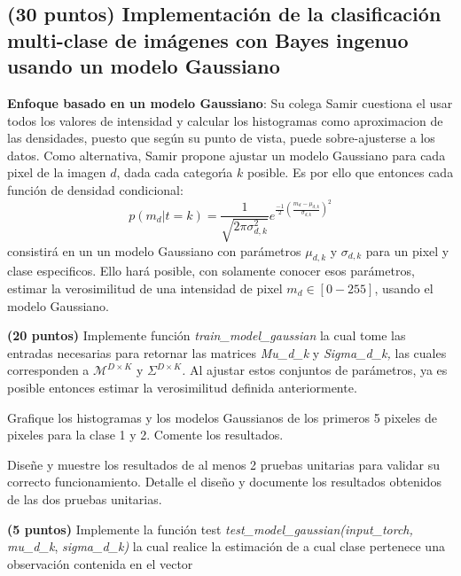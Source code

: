 \documentclass[spanish]{article}
\begin{document}
\begin{myEnumerate}
\section{(30 puntos) Implementaci\'{o}n de la clasificaci\'{o}n multi-clase
de im\'{a}genes con Bayes ingenuo usando un modelo Gaussiano}
\begin{myEnumerate}
\item \textbf{Enfoque basado en un modelo Gaussiano}: Su colega Samir cuestiona
el usar todos los valores de intensidad y calcular los histogramas
como aproximacion de las densidades, puesto que seg\'{u}n su punto
de vista, puede sobre-ajusterse a los datos. Como alternativa, Samir
propone ajustar un modelo Gaussiano para cada pixel de la imagen $d$,
dada cada categor\'{\i}a $k$ posible. Es por ello que entonces cada
funci\'{o}n de densidad condicional: 
\[
p\left(m_{d}|t=k\right)=\frac{1}{\sqrt{2\pi\sigma_{d,k}^{2}}}e^{\frac{-1}{2}\left(\frac{m_{d}-\mu_{d,k}}{\sigma_{d,k}}\right)^{2}}
\]
consistir\'{a} en un un modelo Gaussiano con par\'{a}metros $\mu_{d,k}$
y $\sigma_{d,k}$ para un pixel y clase especificos. Ello har\'{a}
posible, con solamente conocer esos par\'{a}metros, estimar la verosimilitud
de una intensidad de pixel $m_{d}\in\left[0-255\right]$, usando el
modelo Gaussiano.
\begin{myEnumerate}
\item \textbf{(20 puntos)} Implemente funci\'{o}n \emph{train\_model\_gaussian
}la cual tome las entradas necesarias para retornar las\emph{ }matrices\emph{
Mu\_d\_k }y \emph{Sigma\_d\_k, }las cuales corresponden a \emph{$\mathcal{M}^{D\times K}$
}y\emph{ $\Sigma^{D\times K}$. }Al ajustar estos conjuntos de par\'{a}metros,
ya es posible entonces estimar la verosimilitud definida anteriormente.
\begin{myEnumerate}
\item Grafique los histogramas y los modelos Gaussianos de los primeros
5 pixeles  de pixeles para la clase 1 y 2. Comente los resultados.
\item Dise\~{n}e y muestre los resultados de al menos 2 pruebas unitarias
para validar su correcto funcionamiento. Detalle el dise\~{n}o y documente
los resultados obtenidos de las dos pruebas unitarias.
\end{myEnumerate}
\item \textbf{(5 puntos)} Implemente la funci\'{o}n test \emph{test\_model\_gaussian(input\_torch,
mu\_d\_k}, \emph{sigma\_d\_k) }la cual realice la estimaci\'{o}n de
a cual clase pertenece una observaci\'{o}n contenida en el vector

\end{myEnumerate}
\end{myEnumerate}
\end{myEnumerate}
\end{document}
